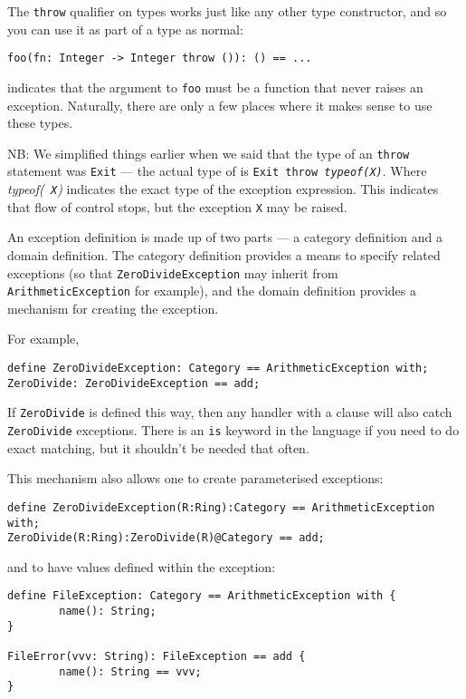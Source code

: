The {\tt throw} qualifier on types works just like any other type
constructor, and so you can use it as part of a type as normal:
\begin{small}
\begin{verbatim}
foo(fn: Integer -> Integer throw ()): () == ...
\end{verbatim}
\end{small}

indicates that the argument to {\tt foo} must be a function that never
raises an exception.  Naturally, there are only a few places where it
makes sense to use these types.

NB: We simplified things earlier when we said that the type of an {\tt throw}
statement was {\tt Exit} --- the actual type of  is
{\tt Exit throw {\em typeof({\tt X})}}.  Where {\em typeof({\tt
X})} indicates the exact type of the exception expression.  This
indicates that flow of control stops, but the exception {\tt X}
may be raised.


An exception definition is made up of two parts --- a category
definition and a domain definition.  The category definition provides
a means to specify related exceptions (so that {\tt ZeroDivideException}
may inherit from {\tt ArithmeticException} for example), and the
domain definition provides a mechanism for creating the exception.

For example, 
\begin{small}
\begin{verbatim}
define ZeroDivideException: Category == ArithmeticException with;
ZeroDivide: ZeroDivideException == add;
\end{verbatim}
\end{small}

If {\tt ZeroDivide} is defined this way, then any handler with a clause 
 will also catch {\tt ZeroDivide} exceptions.
There is an {\tt is} keyword in the language if you need to do exact
matching, but it shouldn't be needed that often.

This mechanism also allows one to create parameterised exceptions:
\begin{small}
\begin{verbatim}
define ZeroDivideException(R:Ring):Category == ArithmeticException with;
ZeroDivide(R:Ring):ZeroDivide(R)@Category == add;
\end{verbatim}
\end{small} 
and to have values defined within the exception:
\begin{small}
\begin{verbatim}
define FileException: Category == ArithmeticException with {
        name(): String;
}

FileError(vvv: String): FileException == add { 
        name(): String == vvv;
}
\end{verbatim}
\end{small} 

